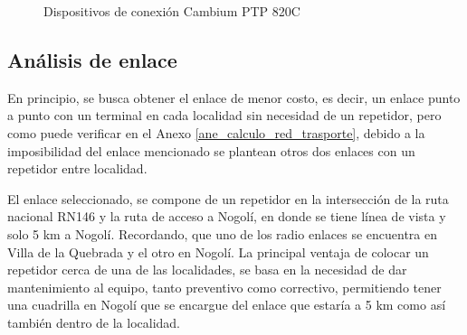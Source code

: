 \documentclass[12pt,a4paper]{book}
\begin{document}
\begin{figure}[H]
\centering
{} 
\caption{Dispositivos de conexión Cambium PTP 820C}
\end{figure}


\subsection{Análisis de enlace} 

En principio, se busca obtener el enlace de menor costo, es decir, un enlace punto a punto con un terminal en cada localidad sin necesidad de un repetidor, pero como puede verificar en el Anexo \ref{ane_calculo_red_trasporte}, debido a la imposibilidad del enlace mencionado se plantean otros dos enlaces con un repetidor entre localidad. 

El enlace seleccionado, se compone de un repetidor en la intersección de la ruta nacional RN146 y la ruta de acceso a Nogolí, en donde se tiene línea de vista y solo 5 km a Nogolí. Recordando, que uno de los radio enlaces se encuentra en Villa de la Quebrada y el otro en Nogolí.
La principal ventaja de colocar un repetidor cerca de una de las localidades, se basa en la necesidad de dar mantenimiento al equipo, tanto preventivo como correctivo, permitiendo tener una cuadrilla en Nogolí que se encargue del enlace que estaría a 5 km como así también dentro de la localidad.
\end{document}
